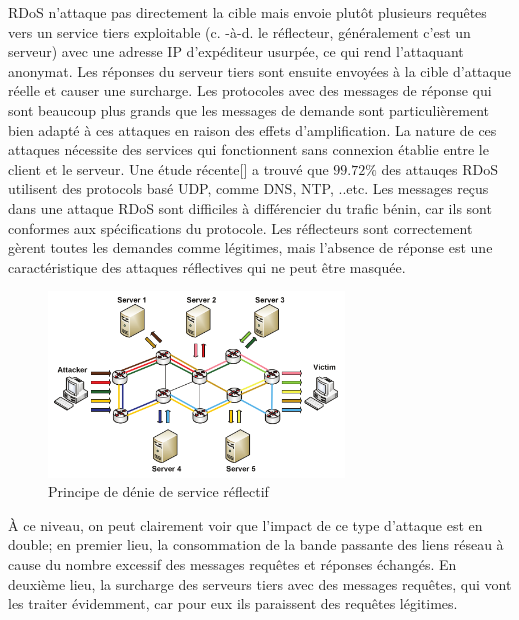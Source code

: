 RDoS n’attaque pas directement la cible mais envoie plutôt plusieurs requêtes vers un service tiers exploitable (c. -à-d. le réflecteur, généralement c'est un serveur) avec une adresse IP d’expéditeur usurpée, ce qui rend l'attaquant anonymat. Les réponses du serveur tiers sont ensuite envoyées à la cible d’attaque réelle et causer une surcharge. Les protocoles avec des messages de réponse qui sont beaucoup plus grands que les messages de demande sont particulièrement bien adapté à ces attaques en raison des effets d’amplification. La nature de ces attaques nécessite des services qui fonctionnent sans connexion établie entre le client et le serveur. Une étude récente[\cite{23}] a trouvé que $ 99.72\% $ des attauqes RDoS utilisent des protocols basé UDP, comme DNS, NTP, ..etc. Les messages reçus dans une attaque RDoS sont difficiles à différencier du trafic bénin, car ils sont conformes aux spécifications du protocole. Les réflecteurs sont correctement gèrent toutes les demandes comme légitimes, mais l’absence de réponse est une caractéristique des attaques réflectives qui ne peut être masquée.

\begin{figure}[h]
\centering
\includegraphics[width=0.7\textwidth]{Figures/rDoS}
\decoRule
\caption{Principe de dénie de service réflectif}
\label{fig:rDoS}
\end{figure} 

À ce niveau, on peut clairement voir que l'impact de ce type d'attaque est en double; en premier lieu, la consommation de la bande passante des liens réseau à cause du nombre excessif des messages requêtes et réponses échangés. En deuxième lieu, la surcharge des serveurs tiers avec des messages requêtes, qui vont les traiter évidemment, car pour eux ils paraissent des requêtes légitimes. 

